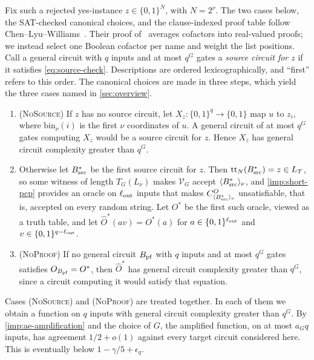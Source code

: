 \documentclass[11pt,letterpaper]{article}
\theoremstyle{definition}
\theoremstyle{remark}
\newcommand{\Tclk}{\mathcal T}
\begin{document}
Fix such a rejected yes-instance $z\in\{0,1\}^N$, with $N=2^\nu$. The
two cases below, the
SAT-checked canonical choices, and the clause-indexed proof table
follow Chen--Lyu--Williams~\cite[Sections~6.2.4--6.2.5]{CLW20}.
Their proof of~\cite[Lemma~6.5]{CLW20} averages cofactors into
real-valued proofs; we instead select one
Boolean cofactor per name and weight the list positions. Call a general
circuit with $q$ inputs and at most $q^G$ gates a \emph{source circuit
for $z$} if it satisfies \eqref{eq:source-check}. Descriptions are
ordered lexicographically, and ``first'' refers to this order. The
canonical choices are made in three steps, which yield the three cases
named in \cref{sec:overview}.
\begin{enumerate}[label=(\roman*)]
\item (\textsc{NoSource}) If $z$ has no source circuit, let $X_z:\{0,1\}^q\to\{0,1\}$ map
$u$ to $z_i$, where $\mathrm{bin}_\nu(i)$ is the first $\nu$ coordinates
of $u$. A general circuit of at most $q^G$ gates computing $X_z$ would
be a source circuit for $z$. Hence $X_z$ has general circuit complexity
greater than $q^G$.
\item Otherwise let $B^*_{\rm src}$ be the first source circuit for $z$.
Then $\mathrm{tt}_N(B^*_{\rm src})=z\in L_{\Tclk}$, so some witness of
length $T_G(L_\nu)$ makes $\mathcal V_G$ accept
$\langle B^*_{\rm src}\rangle_\nu$, and \cref{imp:short-pcp} provides an
oracle on $\ell_{\rm out}$ inputs that makes
$C^O_{\langle B^*_{\rm src}\rangle_\nu}$ unsatisfiable, that is,
accepted on every random string. Let $O^*$ be the first such oracle,
viewed as a truth table, and let $\widehat O^*(av)=O^*(a)$ for
$a\in\{0,1\}^{\ell_{\rm out}}$ and $v\in\{0,1\}^{q-\ell_{\rm out}}$.
\item (\textsc{NoProof}) If no general circuit $B_{\rm pf}$ with $q$ inputs and at most
$q^G$ gates satisfies $O_{B_{\rm pf}}=O^*$, then $\widehat O^*$ has
general circuit complexity greater than $q^G$, since a circuit computing
it would satisfy that equation.
\end{enumerate}
Cases (\textsc{NoSource}) and (\textsc{NoProof}) are treated together. In each of them
we obtain a function on $q$ inputs with general circuit complexity
greater than $q^G$. By
\cref{imp:ae-amplification} and the choice of $G$, the
amplified function, on at most $a_Gq$ inputs, has agreement $1/2+o(1)$
against every target circuit considered here. This is eventually below
$1-\gamma/5+\epsilon_q$.
\end{document}
